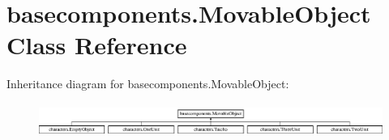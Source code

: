 \hypertarget{classbasecomponents_1_1_movable_object}{\section{basecomponents.\-Movable\-Object Class Reference}
\label{classbasecomponents_1_1_movable_object}
}
Inheritance diagram for basecomponents.\-Movable\-Object\-:\begin{figure}[H]
\begin{center}
\leavevmode
\includegraphics[height=1.098039cm]{classbasecomponents_1_1_movable_object}
\end{center}
\end{figure}
